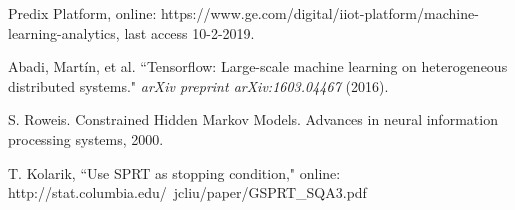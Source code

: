 \documentclass[english]{article}
\numberwithin{equation}{section}
\begin{document}
	
	\begin{thebibliography}{1}
		 Predix Platform, online: https://www.ge.com/digital/iiot-platform/machine-learning-analytics, last access 10-2-2019.		
		
		 Abadi, Martín, et al. ``Tensorflow: Large-scale machine learning on heterogeneous distributed systems." \textit{arXiv preprint arXiv:1603.04467} (2016). 

		S. Roweis. Constrained Hidden Markov Models. Advances in neural information processing systems, 2000.
		
		 T. Kolarik, ``Use SPRT as stopping condition," online: http://stat.columbia.edu/~jcliu/paper/GSPRT\_SQA3.pdf
		
	\end{thebibliography}
	
\end{document}
